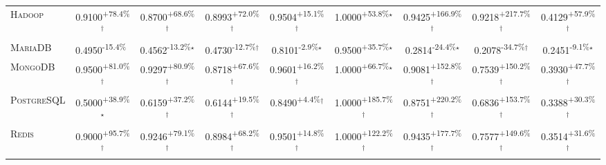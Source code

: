 \begin{table}[htbp]
\begin{tabular}{l|cccc|cccc}
\textsc{Hadoop} & \cellcolor{green!30}0.9100\textsuperscript{+78.4\%}$^\dagger$ & \cellcolor{green!30}0.8700\textsuperscript{+68.6\%}$^\dagger$ & \cellcolor{green!30}0.8993\textsuperscript{+72.0\%}$^\dagger$ & \cellcolor{green!30}0.9504\textsuperscript{+15.1\%}$^\dagger$ & \cellcolor{green!30}1.0000\textsuperscript{+53.8\%}$^\star$ & \cellcolor{green!30}0.9425\textsuperscript{+166.9\%}$^\dagger$ & \cellcolor{green!30}0.9218\textsuperscript{+217.7\%}$^\dagger$ & \cellcolor{green!30}0.4129\textsuperscript{+57.9\%}$^\dagger$ \\
\textsc{MariaDB} & \cellcolor{red!30}0.4950\textsuperscript{-15.4\%}$^{\,\,\,}$ & \cellcolor{red!30}0.4562\textsuperscript{-13.2\%}$^\star$ & \cellcolor{red!30}0.4730\textsuperscript{-12.7\%}$^\dagger$ & \cellcolor{red!30}0.8101\textsuperscript{-2.9\%}$^\star$ & \cellcolor{green!30}0.9500\textsuperscript{+35.7\%}$^\star$ & \cellcolor{red!30}0.2814\textsuperscript{-24.4\%}$^\star$ & \cellcolor{red!30}0.2078\textsuperscript{-34.7\%}$^\dagger$ & \cellcolor{red!30}0.2451\textsuperscript{-9.1\%}$^\star$ \\
\textsc{MongoDB} & \cellcolor{green!30}0.9500\textsuperscript{+81.0\%}$^\dagger$ & \cellcolor{green!30}0.9297\textsuperscript{+80.9\%}$^\dagger$ & \cellcolor{green!30}0.8718\textsuperscript{+67.6\%}$^\dagger$ & \cellcolor{green!30}0.9601\textsuperscript{+16.2\%}$^\dagger$ & \cellcolor{green!30}1.0000\textsuperscript{+66.7\%}$^\star$ & \cellcolor{green!30}0.9081\textsuperscript{+152.8\%}$^\dagger$ & \cellcolor{green!30}0.7539\textsuperscript{+150.2\%}$^\dagger$ & \cellcolor{green!30}0.3930\textsuperscript{+47.7\%}$^\dagger$ \\
\textsc{PostgreSQL} & \cellcolor{green!30}0.5000\textsuperscript{+38.9\%}$^\star$ & \cellcolor{green!30}0.6159\textsuperscript{+37.2\%}$^\dagger$ & \cellcolor{green!30}0.6144\textsuperscript{+19.5\%}$^\dagger$ & \cellcolor{green!30}0.8490\textsuperscript{+4.4\%}$^\dagger$ & \cellcolor{green!30}1.0000\textsuperscript{+185.7\%}$^\dagger$ & \cellcolor{green!30}0.8751\textsuperscript{+220.2\%}$^\dagger$ & \cellcolor{green!30}0.6836\textsuperscript{+153.7\%}$^\dagger$ & \cellcolor{green!30}0.3388\textsuperscript{+30.3\%}$^\dagger$ \\
\textsc{Redis} & \cellcolor{green!30}0.9000\textsuperscript{+95.7\%}$^\dagger$ & \cellcolor{green!30}0.9246\textsuperscript{+79.1\%}$^\dagger$ & \cellcolor{green!30}0.8984\textsuperscript{+68.2\%}$^\dagger$ & \cellcolor{green!30}0.9501\textsuperscript{+14.8\%}$^\dagger$ & \cellcolor{green!30}1.0000\textsuperscript{+122.2\%}$^\dagger$ & \cellcolor{green!30}0.9435\textsuperscript{+177.7\%}$^\dagger$ & \cellcolor{green!30}0.7577\textsuperscript{+149.6\%}$^\dagger$ & \cellcolor{green!30}0.3514\textsuperscript{+31.6\%}$^\dagger$ \\

\end{tabular}
\end{table}
